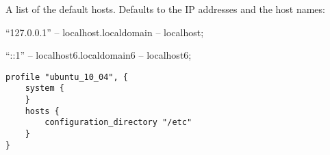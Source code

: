 
A list of the default hosts.
Defaults to the IP addresses and the host names:
\begin{compactitem}
\item ``127.0.0.1'' -- localhost.localdomain -- localhost;
\item ``::1'' -- localhost6.localdomain6 -- localhost6;
\end{compactitem}

\begin{lstlisting}[style=Sscontrol,
label={lst:hosts_ubuntu_profile},
title={Ubuntu hostname profile.}]
profile "ubuntu_10_04", {
    system {
    }
    hosts {
        configuration_directory "/etc"
    }
}
\end{lstlisting}

